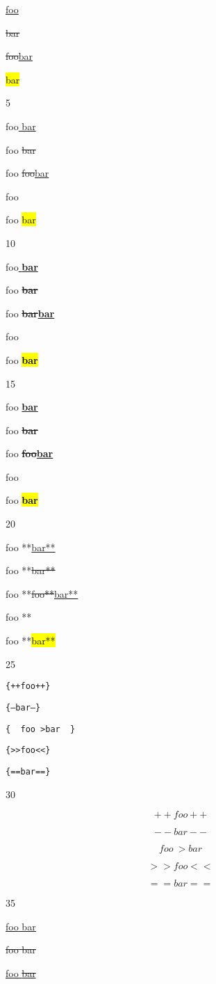 
\def\mytitle{CriticMarkup}


\underline{foo}

\sout{bar}

\sout{foo}\underline{bar}


\hl{bar}

5

foo\underline{ bar}

foo\sout{ bar}

foo \sout{foo}\underline{bar}

foo 

foo \hl{bar}

10

foo\underline{ \textbf{bar}}

foo\sout{ \textbf{bar}}

foo \sout{\textbf{bar}}\underline{\textbf{bar}}

foo 

foo \hl{\textbf{bar}}

15

foo \textbf{\underline{bar}}

foo \textbf{\sout{bar}}

foo \textbf{\sout{foo}\underline{bar}}

foo \textbf{}

foo \textbf{\hl{bar}}

20

foo **\underline{bar**}

foo **\sout{bar**}

foo **\sout{foo**}\underline{bar**}

foo **

foo **\hl{bar**}

25

\texttt{\{++foo++\}}

\texttt{\{--bar--\}}

\texttt{\{~~foo~>bar~~\}}

\texttt{\{>>foo<<\}}

\texttt{\{==bar==\}}

30

$${++foo++}$$

$${--bar--}$$

$${~~foo~>bar~~}$$

$${>>foo<<}$$

$${==bar==}$$

35

\underline{foo\underline{ bar}}

\sout{foo\sout{ bar}}

\underline{foo\sout{ bar}}



